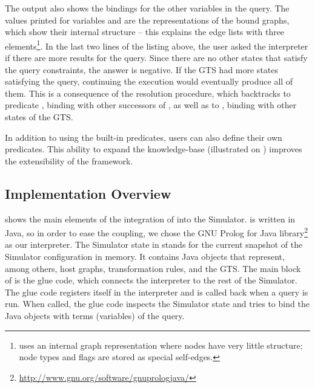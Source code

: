 %
The output also shows the bindings for the other variables in the query. The
values printed for variables  and  are the
 representations of the bound graphs, which show their
internal structure -- this explains the edge lists with three
elements\footnote{\GROOVE uses an internal graph representation where nodes have
very little structure; node types and flags are stored as special self-edges.}.
In the last two lines of the listing above, the user asked the interpreter if
there are more results for the query.  Since there are no other states that
satisfy the query constraints, the answer is negative. If the GTS had more
states satisfying the query, continuing the execution would eventually produce
all of them. This is a consequence of the \Prolog resolution procedure, which
backtracks to predicate , binding  with other
successors of , as well as to , binding  with
other states of the GTS.

In addition to using the built-in \GROOVE predicates, users can also define
their own \Prolog predicates. This ability to expand the \Prolog knowledge-base
(illustrated on ) improves the extensibility of the framework.


\subsection{Implementation Overview}

 shows the main elements of the integration of \Prolog
into the Simulator. \GROOVE is written in Java, so in order to ease the
coupling, we chose the GNU Prolog for Java
library\footnote{\url{http://www.gnu.org/software/gnuprologjava/}}
\cite{Diaz2000} as our \Prolog interpreter. The Simulator state in
 stands for the current snapshot of the Simulator
configuration in memory. It contains Java objects that represent, among others,
host graphs, transformation rules, and the GTS. The main block of
 is the glue code, which connects the \Prolog interpreter
to the rest of the Simulator. The glue code registers itself in the interpreter
and is called back when a \Prolog query is run. When called, the glue code
inspects the Simulator state and tries to bind the Java objects with terms
(variables) of the query.

